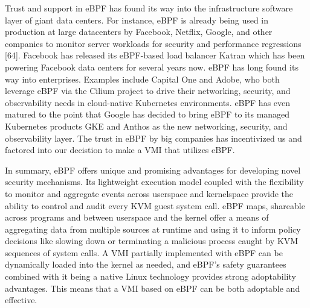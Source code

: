 \documentclass{report}
\begin{document}
\begin{spacing}{1.5}
{\large
Trust and support in eBPF has found its way into the infrastructure software layer of giant data centers. For instance, eBPF is already being used in production at large datacenters by Facebook, Netflix, Google, and other companies to monitor server workloads for security and performance regressions [64]. Facebook has released its eBPF-based load balancer Katran which has been powering Facebook data centers for several years now. eBPF has long found its way into enterprises. Examples include Capital One and Adobe, who both leverage eBPF via the Cilium project to drive their networking, security, and observability needs in cloud-native Kubernetes environments. eBPF has even matured to the point that Google has decided to bring eBPF to its managed Kubernetes products GKE and Anthos as the new networking, security, and observability layer. The trust in eBPF by big companies has incentivized us and factored into our decistion to make a VMI that utilizes eBPF.
\newline
}

{\large
In summary, eBPF offers unique and promising advantages for developing novel security mechanisms. Its lightweight execution model coupled with the flexibility to monitor and aggregate events across userspace and kernelspace provide the ability to control and audit every KVM guest system call. eBPF maps, shareable across programs and between userspace and the kernel offer a means of aggregating data from multiple sources at runtime and using it to inform policy decisions like slowing down or terminating a malicious process caught by KVM sequences of system calls. A VMI partially implemented with eBPF can be dynamically loaded into the kernel as needed, and eBPF’s safety guarantees combined with it being a native Linux technology provides strong adoptability advantages. This means that a VMI based on eBPF can be both adoptable and effective.
\newline
}















\end{spacing}
\end{document}

